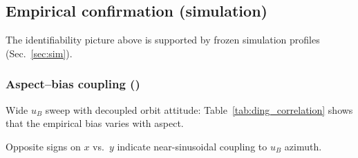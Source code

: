 \subsection{Empirical confirmation (simulation)}
\label{sec:mechanism_empirical}

The identifiability picture above is supported by frozen simulation profiles
(Sec.~\ref{sec:sim}).

\subsubsection{Aspect--bias coupling (\flightD{})}
Wide $u_B$ sweep with decoupled orbit attitude:
Table~\ref{tab:ding_correlation} shows that the empirical bias varies with aspect.

\begin{table}[!t]
  \centering
  \caption{Aspect--bias coupling on \flightD{} (simulation).}
  \label{tab:ding_correlation}
  \footnotesize
\end{table}

Opposite signs on $x$ vs.\ $y$ indicate near-sinusoidal coupling to $u_B$ azimuth.

